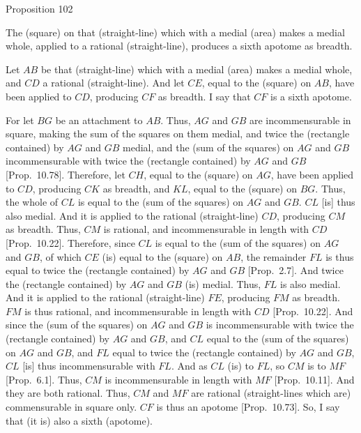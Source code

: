 
\begin{center}
{\large Proposition 102}
\end{center}

The (square) on that (straight-line)
which with a medial (area) makes a medial whole, applied to
a rational (straight-line), produces a sixth apotome as breadth.

\epsfysize=1.6in
\centerline{}

Let $AB$ be that (straight-line) which with a medial (area) makes a
medial whole, and $CD$ a rational (straight-line). And let $CE$,
equal to the (square) on $AB$, have been applied to $CD$, producing
$CF$ as breadth. I say that $CF$ is a sixth apotome.

For let $BG$ be an attachment to $AB$. Thus, $AG$ and $GB$
are incommensurable in square, making the sum of the squares on them
medial, and twice the (rectangle contained) by $AG$ and $GB$ medial,
and the (sum of the squares) on $AG$ and $GB$ incommensurable
with twice the (rectangle contained) by $AG$ and $GB$ [Prop.~10.78]. Therefore, let $CH$, equal to
the (square) on $AG$, have been applied to $CD$, producing $CK$
as breadth, and $KL$, equal to the (square) on $BG$. Thus, the whole of
$CL$ is equal to the (sum of the squares) on $AG$ and $GB$. $CL$ [is]
thus also medial. And it is applied to the rational (straight-line) $CD$,
producing $CM$ as breadth. Thus,  $CM$ is rational, and incommensurable
in length with $CD$ [Prop.~10.22]. Therefore,
since $CL$ is equal to the (sum of the squares) on $AG$ and $GB$,
of which $CE$ (is) equal to the (square) on $AB$, the remainder $FL$
is thus equal to twice the (rectangle contained) by $AG$ and $GB$ [Prop.~2.7]. And twice the (rectangle contained)
by  $AG$ and $GB$ (is) medial. Thus, $FL$ is also medial.
And it is applied to the rational (straight-line) $FE$, producing $FM$
as breadth. $FM$ is thus rational, and incommensurable
in length with $CD$ [Prop.~10.22]. 
And since the (sum of the squares) on $AG$ and $GB$ is incommensurable
with twice the (rectangle contained) by $AG$ and $GB$, and $CL$ equal to the
(sum of the squares) on $AG$ and $GB$, and $FL$ equal to twice the
(rectangle contained) by $AG$ and $GB$, $CL$ [is] thus
incommensurable with $FL$. And as $CL$ (is) to $FL$, so $CM$ is
to $MF$ [Prop.~6.1]. Thus, $CM$ is incommensurable
in length with $MF$ [Prop.~10.11]. And they
are both rational. Thus, $CM$ and $MF$ are rational (straight-lines which are) commensurable in square only. $CF$ is thus an apotome [Prop.~10.73]. So, I say that (it is) also a
sixth (apotome).

